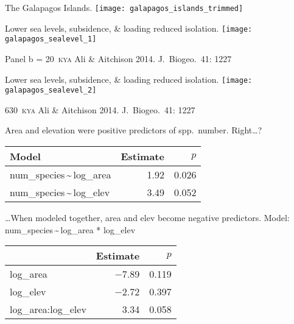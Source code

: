 \documentclass[t]{beamer}
\begin{document}
\begin{frame}{The Galapagos Islands.}
		\texttt{[image: galapagos\_islands\_trimmed]}
\end{frame}

\begin{frame}{Lower sea levels, subsidence, \& loading reduced isolation.}
		\texttt{[image: galapagos\_sealevel\_1]}
	
	\vfilll
	
	\tiny Panel b = 20~\textsc{kya} \hfill Ali \& Aitchison 2014. J.~Biogeo.~41: 1227
		
\end{frame}


\begin{frame}{Lower sea levels, subsidence, \& loading reduced isolation.}
	\centering
		\texttt{[image: galapagos\_sealevel\_2]}

	\vfilll

\tiny 630~\textsc{kya} \hfill Ali \& Aitchison 2014. J.~Biogeo.~41: 1227

\end{frame}

{
\begin{frame}

\end{frame}
}

\begin{frame}{Area and elevation were positive predictors of spp.~number. Right\dots?}
\centering

\begin{tabular}{lrr}	
	\toprule
	 Model & Estimate & $p$ \tabularnewline
	 \midrule
	 num\_species\,\textasciitilde\,log\_area	&	1.92	& 0.026 \tabularnewline
	 num\_species\,\textasciitilde\,log\_elev	&	3.49 	& 0.052 \tabularnewline
	 \bottomrule
\end{tabular}

\end{frame}



\begin{frame}{\dots When modeled together, area and elev become negative predictors. }
\centering
Model: num\_species\,\textasciitilde\,log\_area * log\_elev

\begin{tabular}{lrr}
	\toprule
	 & Estimate & $p$ \tabularnewline
	 \midrule
	 log\_area	& $-$7.89	& 0.119 \tabularnewline
	 log\_elev	& $-$2.72	& 0.397 \tabularnewline
	 log\_area:log\_elev	&	3.34	&	0.058\tabularnewline
	 \bottomrule
\end{tabular}
\end{frame}
\end{document}
